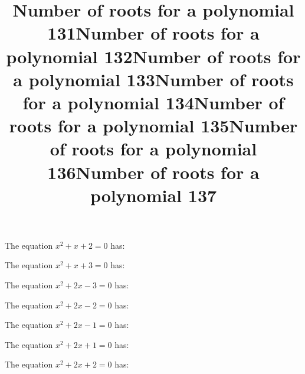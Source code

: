 \documentclass{article}
\begin{document}
\begin{category}
\begin{question}[multichoice]
\end{question}
\begin{question}[multichoice]
\title{Number of roots for a polynomial 131}
The equation $x^{2} + x + 2=0$ has:



\end{question}
\begin{question}[multichoice]
\title{Number of roots for a polynomial 132}
The equation $x^{2} + x + 3=0$ has:



\end{question}
\begin{question}[multichoice]
\title{Number of roots for a polynomial 133}
The equation $x^{2} + 2 x - 3=0$ has:



\end{question}
\begin{question}[multichoice]
\title{Number of roots for a polynomial 134}
The equation $x^{2} + 2 x - 2=0$ has:



\end{question}
\begin{question}[multichoice]
\title{Number of roots for a polynomial 135}
The equation $x^{2} + 2 x - 1=0$ has:



\end{question}
\begin{question}[multichoice]
\title{Number of roots for a polynomial 136}
The equation $x^{2} + 2 x + 1=0$ has:



\end{question}
\begin{question}[multichoice]
\title{Number of roots for a polynomial 137}
The equation $x^{2} + 2 x + 2=0$ has:


\end{question}
\end{category}
\end{document}
